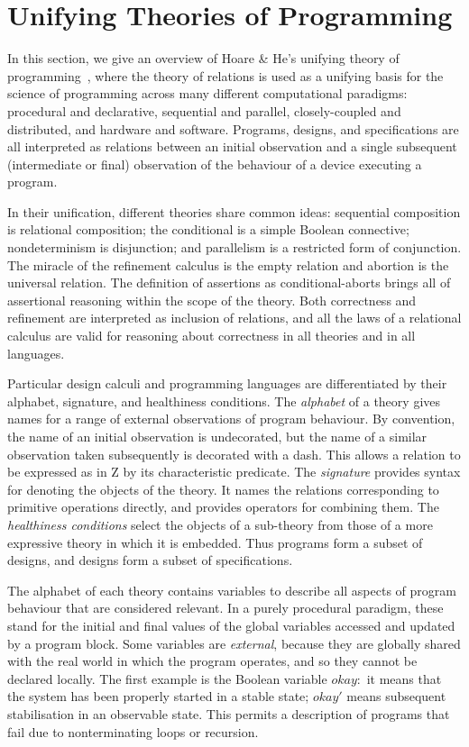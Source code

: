 \documentclass{article}
\begin{document}
\section{Unifying Theories of Programming} \label{section:TUT}

In this section, we give an overview of Hoare \& He's unifying theory
of programming~\cite{HH98}, where the theory of relations is used as a
unifying basis for the science of programming across many different
computational paradigms: procedural and declarative, sequential and
parallel, closely-coupled and distributed, and hardware and software.
Programs, designs, and specifications are all interpreted as relations
between an initial observation and a single subsequent (intermediate
or final) observation of the behaviour of a device executing a
program.

In their unification, different theories share common ideas:
sequential composition is relational composition; the conditional is a
simple Boolean connective; nondeterminism is disjunction; and
parallelism is a restricted form of conjunction.  The miracle of the
refinement calculus is the empty relation and abortion is the
universal relation.  The definition of assertions as
conditional-aborts brings all of assertional reasoning within the
scope of the theory.  Both correctness and refinement are interpreted
as inclusion of relations, and all the laws of a relational calculus
are valid for reasoning about correctness in all theories and in all
languages.

Particular design calculi and programming languages are differentiated
by their alphabet, signature, and healthiness conditions.  The
\emph{alphabet} of a theory gives names for a range of external
observations of program behaviour.  By convention, the name of an
initial observation is undecorated, but the name of a similar
observation taken subsequently is decorated with a dash.  This allows
a relation to be expressed as in Z by its characteristic predicate.
The \emph{signature} provides syntax for denoting the objects of the
theory.  It names the relations corresponding to primitive operations
directly, and provides operators for combining them.  The
\emph{healthiness conditions} select the objects of a sub-theory from
those of a more expressive theory in which it is embedded.  Thus
programs form a subset of designs, and designs form a subset of
specifications.

The alphabet of each theory contains variables to describe all aspects
of program behaviour that are considered relevant.  In a purely
procedural paradigm, these stand for the initial and final values of
the global variables accessed and updated by a program block.  Some
variables are \emph{external}, because they are globally shared with
the real world in which the program operates, and so they cannot be
declared locally.  The first example is the Boolean variable
$okay$:~it means that the system has been properly started in a stable
state; $okay'$ means subsequent stabilisation in an observable state.
This permits a description of programs that fail due to nonterminating
loops or recursion.
\end{document}

